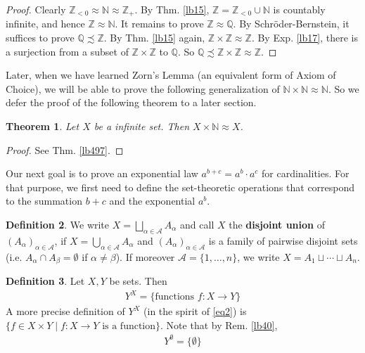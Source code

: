 \documentclass[12pt,b5paper,notitlepage]{article}
\theoremstyle{definition}
\newtheorem{df}{Definition}[section]
\theoremstyle{plain}
\newtheorem{thm}[df]{Theorem}
\newcommand{\scr}{\mathscr}
\newcommand{\Nbb}{\mathbb N}
\newcommand{\Zbb}{\mathbb Z}
\newcommand{\Qbb}{\mathbb Q}
\numberwithin{equation}{section}
\begin{document}
\begin{proof}
Clearly $\Zbb_{<0}\approx\Nbb\approx \Zbb_+$. By Thm. \ref{lb15}, $\Zbb=\Zbb_{<0}\cup\Nbb$ is countably infinite, and hence $\Zbb\approx\Nbb$. It remains to prove $\Zbb\approx\Qbb$. By Schr\"oder-Bernstein, it suffices to prove $\Qbb\precsim\Zbb$.  By Thm. \ref{lb15} again, $\Zbb\times\Zbb\approx\Zbb$. By Exp. \ref{lb17}, there is a surjection from a subset of $\Zbb\times\Zbb$ to $\Qbb$. So $\Qbb\precsim\Zbb\times\Zbb\approx\Zbb$.
\end{proof}



Later, when we have learned Zorn's Lemma (an equivalent form of Axiom of Choice), we will be able to prove the following generalization of $\Nbb\times\Nbb\approx\Nbb$. So we defer the proof of the following theorem to a later section.

\begin{thm}\label{lb16}
Let $X$ be a infinite set. Then $X\times\Nbb\approx X$.
\end{thm}

\begin{proof}
See Thm. \ref{lb497}.
\end{proof}



Our next goal is to prove an exponential law $a^{b+c}=a^b\cdot a^c$ for cardinalities. For that purpose, we first need to define the set-theoretic operations that correspond to the summation $b+c$ and the exponential $a^b$.


\begin{df}
We write $X=\bigsqcup_{\alpha\in\scr A}A_\alpha$ \index{A@$\bigsqcup_{\alpha\in\scr A}A_\alpha$, the disjoint union} and call $X$ the \textbf{disjoint union}  of $(A_\alpha)_{\alpha\in\scr A}$,  if $X=\bigcup_{\alpha\in\scr A}A_\alpha$ and $(A_\alpha)_{\alpha\in\scr A}$ is a family of pairwise disjoint sets (i.e. $A_\alpha\cap A_\beta=\emptyset$ if $\alpha\neq\beta$). If moreover $\scr A=\{1,\dots,n\}$, we write $X=A_1\sqcup\cdots\sqcup A_n$.
\end{df}

\begin{df}
Let $X,Y$ be sets. Then 
\begin{align}
Y^X=\{\text{functions }f:X\rightarrow Y\}
\end{align}
A more precise definition of $Y^X$ (in the spirit of \eqref{eq2}) is $\{f\in X\times Y \mid f:X\rightarrow Y\text{ is a function}\}$. Note that by Rem. \ref{lb40},
\begin{align}
Y^\emptyset=\{\emptyset\}  \label{eq10}
\end{align}
\end{df}
\end{document}
